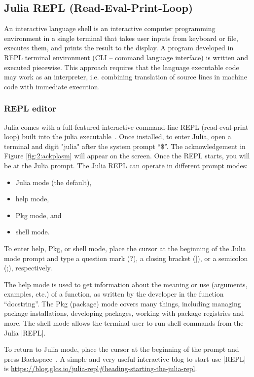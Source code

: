 \begin{script}
\section{Julia REPL (Read-Eval-Print-Loop)}\label{sect:2-5}

An interactive language shell is an interactive computer programming environment in a single terminal  that takes user inputs from keyboard or file, executes them, and prints the result to the display. A program developed in REPL terminal environment (CLI -- command language interface) is written and executed piecewise. This approach requires that the language executable code may work as an interpreter, i.e. combining translation of source lines in machine code with immediate execution.
 

\subsubsection*{REPL editor}\label{sect:2-5-1}

Julia comes with a full-featured interactive command-line REPL (read-eval-print loop) built into the julia executable~\cite{}. Once installed, to enter Julia, open a terminal and digit "julia" after the system prompt “\$”. The  acknowledgement in Figure \ref{fig:2:ackplasm}
will appear on the screen. Once the REPL starts, you will be at the Julia prompt. The Julia REPL can operate in different prompt modes:
\begin{itemize}
\item 
Julia mode (the default),
\item 
help mode,
\item 
Pkg mode, and
\item 
shell mode.
\end{itemize}
To enter help, Pkg, or shell mode, place the cursor at the beginning of the Julia mode prompt and type a question mark (?), a closing bracket (]), or a semicolon (;), respectively. 

The help mode is used to get information about the meaning or use (arguments, examples, etc.) of a function, as written by the developer in the function  “docstring”. The Pkg (package) mode covers many things, including managing package installations, developing packages, working with package registries and more. The shell mode allows the terminal user to run shell commands from the Julia |REPL|.

To return to Julia mode, place the cursor at the beginning of the prompt and press Backspace~\cite{repl:Whitaker:2024}.
A simple and very useful interactive blog to start use |REPL| is \href{https://blog.glcs.io/julia-repl#heading-starting-the-julia-repl}{https://blog.glcs.io/julia-repl#heading-starting-the-julia-repl}. 



\end{script}
